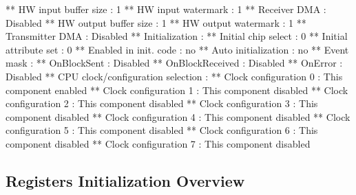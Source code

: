 \begin{DoxyCode}
**            HW input buffer size                         : 1
**            HW input watermark                           : 1
**            Receiver DMA                                 : Disabled
**            HW output buffer size                        : 1
**            HW output watermark                          : 1
**            Transmitter DMA                              : Disabled
**          Initialization                                 : 
**            Initial chip select                          : 0
**            Initial attribute set                        : 0
**            Enabled in init. code                        : no
**            Auto initialization                          : no
**            Event mask                                   : 
**              OnBlockSent                                : Disabled
**              OnBlockReceived                            : Disabled
**              OnError                                    : Disabled
**          CPU clock/configuration selection              : 
**            Clock configuration 0                        : This component enabled
**            Clock configuration 1                        : This component disabled
**            Clock configuration 2                        : This component disabled
**            Clock configuration 3                        : This component disabled
**            Clock configuration 4                        : This component disabled
**            Clock configuration 5                        : This component disabled
**            Clock configuration 6                        : This component disabled
**            Clock configuration 7                        : This component disabled
\end{DoxyCode}
 \hypertarget{SM_SPI0_regs_overview}{}\subsection{Registers Initialization Overview}\label{SM_SPI0_regs_overview}

